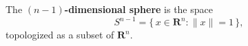 The \textbf{$(n-1)$-dimensional sphere} is the space
$$
S^{n-1} = \{\, x \in \mathbf{R}^n : \|x\| = 1 \,\},
$$
topologized as a subset of $\mathbf{R}^n$.
